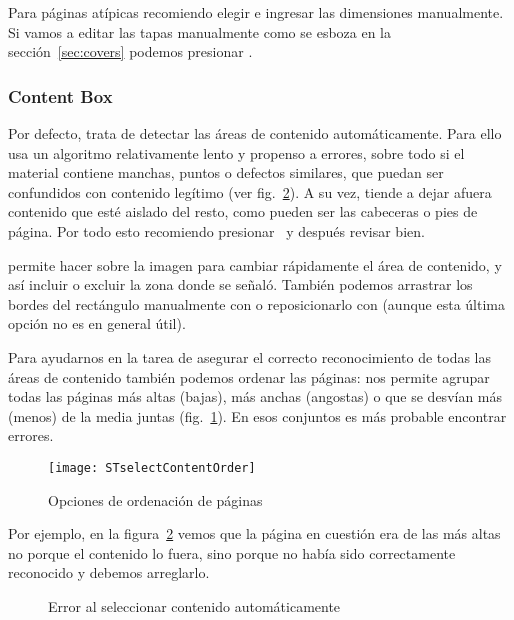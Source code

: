 \documentclass[%
	a5paper,
	10pt,
	twoside,
	openright,
	final,
]{memoir}
\begin{document}
	Para páginas atípicas recomiendo elegir  e ingresar las dimensiones manualmente. Si vamos a editar las tapas manualmente como se esboza en la sección~\ref{sec:covers} podemos presionar .

	\subsubsection{Content Box} Por defecto, \scantailor trata de detectar las áreas de contenido automáticamente. Para ello usa un algoritmo relativamente lento y propenso a errores, sobre todo si el material contiene manchas, puntos o defectos similares, que puedan ser confundidos con contenido legítimo (ver fig.~\ref{fig:STselectContentError}). A su vez, tiende a dejar afuera contenido que esté aislado del resto, como pueden ser las cabeceras o pies de página. Por todo esto recomiendo presionar \play\ y después revisar bien.

	\scantailorAdvanced permite hacer \menu{\leftclick\,\leftclick} sobre la imagen para cambiar rápidamente el área de contenido, y así incluir o excluir la zona donde se señaló. También podemos arrastrar los bordes del rectángulo manualmente con  o reposicionarlo con  (aunque esta última opción no es en general útil).

	Para ayudarnos en la tarea de asegurar el correcto reconocimiento de todas las áreas de contenido también podemos ordenar las páginas:  nos permite agrupar todas las páginas más altas (bajas), más anchas (angostas) o que se desvían más (menos) de la media juntas (fig.~\ref{fig:STselectContentOrder}). En esos conjuntos es más probable encontrar errores.

	\begin{figure}
		\centering
		\texttt{[image: STselectContentOrder]}
		\caption{Opciones de ordenación de páginas\label{fig:STselectContentOrder}}
	\end{figure}

	Por ejemplo, en la figura~\ref{fig:STselectContentError} vemos que la página en cuestión era de las más altas no porque el contenido lo fuera, sino porque no había sido correctamente reconocido y debemos arreglarlo.

	\begin{figure}
		\centering
		\caption{Error al seleccionar contenido automáticamente\label{fig:STselectContentError}}
	\end{figure}
\end{document}
